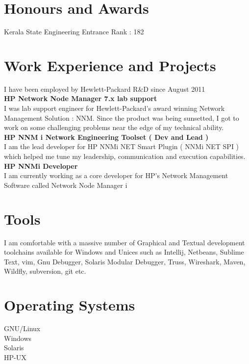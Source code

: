 \documentclass[line,margin]{res}
\begin{document}
\begin{resume}
\section{Honours and Awards}
Kerala State Engineering Entrance Rank : 182\\

\section{Work Experience and Projects}

I have been employed by Hewlett-Packard R\&D since August 2011\\

{\bf HP Network Node Manager 7.x lab support}\\
I was lab support engineer for Hewlett-Packard's award winning Network Management Solution : NNM. Since the product was being sunsetted, I got to work on some challenging problems near the edge of my technical ability.\\

{\bf HP NNM i Network Engineering Toolset ( Dev and Lead )}\\
I am the lead developer for HP NNMi NET Smart Plugin ( NNMi NET SPI ) which helped me tune my leadership, communication and execution capabilities.\\

{\bf HP NNMi Developer}\\
I am currently working as a core developer for HP's Network Management Software called Network Node Manager i\\

\section{Tools}
I am comfortable with a massive number of Graphical and Textual development toolchains available for Windows and Unices such as Intellij, Netbeans, Sublime Text, vim, Gnu Debugger, Solaris Modular Debugger, Truss, Wireshark, Maven, Wildfly, subversion, git etc.\\

\section{Operating Systems}
GNU/Linux\\
Windows\\
Solaris\\
HP-UX\\


\end{resume}
\end{document}
